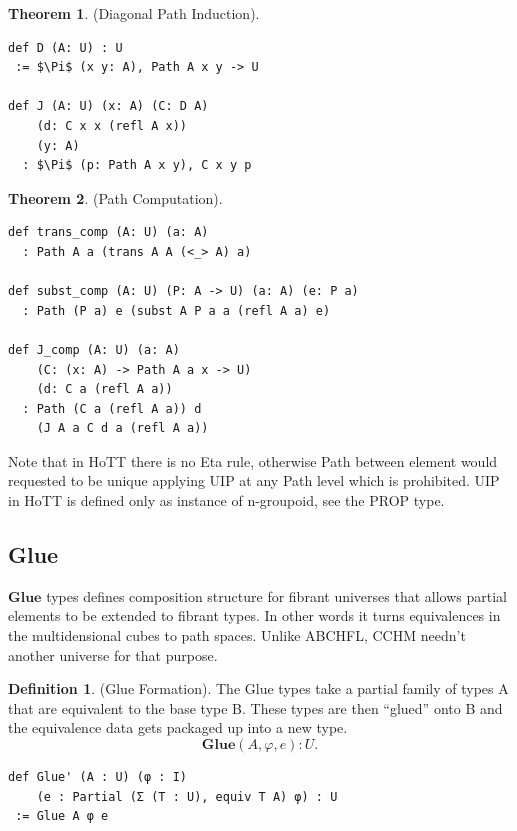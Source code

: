 \documentclass{article}
\theoremstyle{definition}
\newtheorem{definition}{Definition}
\newtheorem{theorem}{Theorem}
\begin{document}
\begin{theorem} (Diagonal Path Induction).
\begin{lstlisting}[mathescape=true]
def D (A: U) : U
 := $\Pi$ (x y: A), Path A x y -> U

def J (A: U) (x: A) (C: D A)
    (d: C x x (refl A x))
    (y: A)
  : $\Pi$ (p: Path A x y), C x y p
\end{lstlisting}
\end{theorem}

\newpage
\begin{theorem} (Path Computation).
\begin{lstlisting}[mathescape=true]
def trans_comp (A: U) (a: A)
  : Path A a (trans A A (<_> A) a)

def subst_comp (A: U) (P: A -> U) (a: A) (e: P a)
  : Path (P a) e (subst A P a a (refl A a) e)

def J_comp (A: U) (a: A)
    (C: (x: A) -> Path A a x -> U)
    (d: C a (refl A a))
  : Path (C a (refl A a)) d
    (J A a C d a (refl A a))
\end{lstlisting}
\end{theorem}

Note that in HoTT there is no Eta rule, otherwise
Path between element would requested to be unique applying
UIP at any Path level which is prohibited. UIP in HoTT
is defined only as instance of n-groupoid, see the PROP type.


\newpage
\subsection{Glue}

$\mathbf{Glue}$ types defines composition structure for fibrant
universes that allows partial elements to be extended
to fibrant types. In other words it turns equivalences
in the multidensional cubes to path spaces.
Unlike ABCHFL, CCHM needn't another universe for that purpose.

\begin{definition} (Glue Formation).
The Glue types take a partial family of types A that are equivalent
to the base type B. These types are then “glued” onto B and the
equivalence data gets packaged up into a new type.
$$
  \mathbf{Glue}(A,\varphi,e) : U.
$$
\begin{lstlisting}[mathescape=true]
def Glue' (A : U) (φ : I)
    (e : Partial (Σ (T : U), equiv T A) φ) : U
 := Glue A φ e
\end{lstlisting}
\end{definition}
\end{document}

